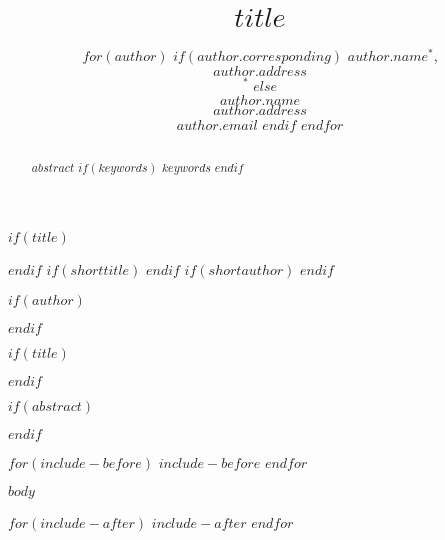 \documentclass[numbib]{imamat}
\begin{document}
$if(title)$
\title{$title$}
$endif$  
$if(shorttitle)$
$endif$ 
$if(shortauthor)$
$endif$ 

$if(author)$
\author{$for(author)$
$if(author.corresponding)$
{\sc $author.name$}\(^*\), \\[2pt] $author.address$ \\ \(^*\){}
$else$
\\[6pt] {\sc $author.name$} \\[2pt] $author.address$ \\ {$author.email$}  
$endif$
$endfor$}
$endif$

$if(title)$
\maketitle
$endif$



$if(abstract)$
\begin{abstract}
{$abstract$}
$if(keywords)$ 
{$keywords$}
$endif$
\end{abstract}
$endif$


$for(include-before)$
$include-before$
$endfor$

$body$

$for(include-after)$
$include-after$
$endfor$



\end{document}
